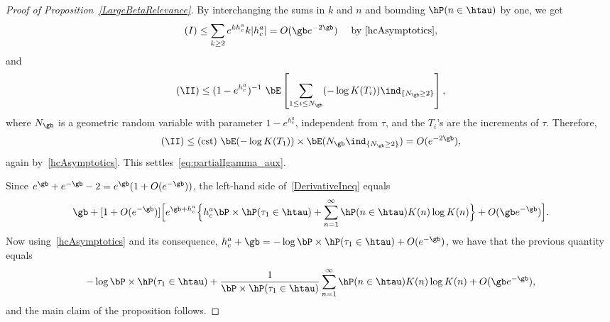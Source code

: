\begin{proof}[Proof of Proposition~\ref{LargeBetaRelevance}]
By interchanging the sums in $k$ and $n$ and bounding $\hP(n \in \htau)$ by one, we get
\begin{equation}
(I) \leq \sum_{k\geq2} e^{k h_c^a} k |h_c^a| = O(\gb e^{- 2 \gb}) \quad \text{ by~\eqref{hcAsymptotics}},
\end{equation}
and
\begin{equation}
(\II) \leq (1 - e^{h_c^a})^{-1}\ \bE \left[\sum_{1 \leq i \leq N_\gb} (- \log K(T_i)) \ind_{\{N_\gb \geq 2\}} \right],
\end{equation}
where $N_\gb$ is a geometric random variable with parameter $1 - e^{h_c^a}$, independent from $\tau$, and the $T_i$'s are the increments of $\tau$. Therefore,
\begin{equation}
(\II) \leq \text{(cst)}\ \bE(-\log K(T_1)) \times \bE(N_\gb \ind_{\{N_\gb \geq 2\}}) = O(e^{- 2 \gb}),
\end{equation}
again by~\eqref{hcAsymptotics}. This settles~\eqref{eq:partialIgamma_aux}.

Since $e^\gb + e^{- \gb} - 2 = e^{\gb} (1 + O(e^{- \gb}))$, the left-hand side of~\eqref{DerivativeIneq} equals
\begin{equation}\label{DerivativeIneq2}
\gb + [1+O(e^{-\gb})]\Big[e^{\gb + h_c^a} \Big\{ h_c^a \bP \times \hP(\tau_1 \in \htau) + \sum_{n=1}^\infty \hP(n \in \htau) K(n) \log K(n)\Big\} + O(\gb e^{-\gb})\Big].
\end{equation}
Now using~\eqref{hcAsymptotics} and its consequence, $h_c^a + \gb = - \log \bP \times \hP(\tau_1 \in \htau) + O(e^{- \gb})$, we have that the previous quantity equals
\begin{equation}
- \log \bP \times \hP(\tau_1 \in \htau) + \frac{1}{\bP \times \hP(\tau_1 \in \htau)} \sum_{n=1}^\infty \hP(n \in \htau) K(n) \log K(n) + O(\gb e^{-\gb}),
\end{equation}
and the main claim of the proposition follows.


\end{proof}
